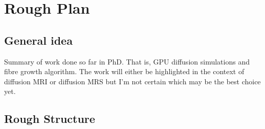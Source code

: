 \chapter{Rough Plan	}
\label{sec:plan}

\section{General idea}
Summary of work done so far in PhD. That is, GPU diffusion simulations and fibre growth algorithm. 
The work will either be highlighted in the context of diffusion MRI or diffusion MRS but I'm not certain which may be the best choice yet. 

\section{Rough Structure}
